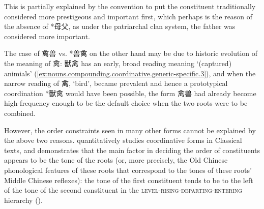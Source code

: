 \documentclass[UTF8, a4paper, oneside, scheme=plain, 12pt]{ctexrep}
\newcommand{\translate}[1]{`#1'}
\newcommand*{\category}[1]{\textsc{#1}}
\begin{document}
This is partially explained by the convention to put the constituent traditionally considered more prestigeous and important first,
which perhaps is the reason of the absence of *母父,
as under the patriarchal clan system, the father was considered more important.

The case of 禽兽 vs. *兽禽 on the other hand may be due to historic evolution of the meaning of 禽:
獸禽 has an early, broad reading meaning \translate{(captured) animials} (\ref{ex:nouns.compounding.coordinative.generic-specific.3}),
and when the narrow reading of 禽, \translate{bird}, became prevalent and hence a prototypical coordination *獸禽 would have been possible,
the form 禽兽 had already become high-frequency enough to be the default choice when the two roots were to be combined.

However, the order constraints seen in many other forms cannot be explained by the above two reasons. 
\citet{zhang1996coordination} quantitatively studies coordinative forms in Classical texts,
and demonstrates that the main factor in deciding the order of constituents appears to be the tone of the roots 
(or, more precisely, the Old Chinese phonological features of these roots that correspond to the tones of these roots' Middle Chinese reflexes):
the tone of the first constituent tends to be to the left of the tone of the second constituent in the \category{level}-\category{rising}-\category{departing}-\category{entering} hierarchy ().
\end{document}
